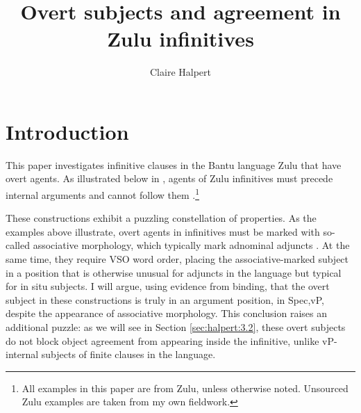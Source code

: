 \documentclass[output=paper,colorlinks,citecolor=brown]{langscibook}
\author{Claire Halpert\affiliation{University of Minnesota}}
\title{Overt subjects and agreement in Zulu infinitives}
\begin{document}
\maketitle 

\section{Introduction}\label{sec:halpert:1}

This paper investigates infinitive clauses in the Bantu language Zulu that have overt agents. As illustrated below in , agents of Zulu infinitives must precede internal arguments  and cannot follow them .\footnote{All examples in this paper are from Zulu, unless otherwise noted. Unsourced Zulu examples are taken from my own fieldwork.}

\ea%
    \label{ex:halpert:1}
    \z
\z

These constructions exhibit a puzzling constellation of properties. As the examples above illustrate, overt agents in infinitives must be marked with so-called associative morphology, which typically mark adnominal adjuncts \citep[e.g.][]{Sabelo1990,Halpert2015,Pietraszko2019}.  At the same time, they require VSO word order, placing the associative-marked subject in a position that is otherwise unusual for adjuncts in the language but typical for in situ subjects. I will argue, using evidence from binding, that the overt subject in these constructions is truly in an argument position, in Spec,vP, despite the appearance of associative morphology.  This conclusion raises an additional puzzle: as we will see in Section \ref{sec:halpert:3.2}, these overt subjects do not block object agreement from appearing inside the infinitive, unlike vP-internal subjects of finite clauses in the language. 
\end{document}
